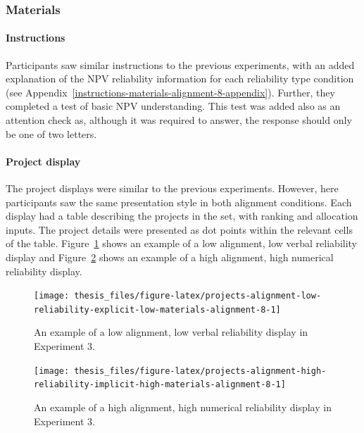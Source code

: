 \documentclass[a4paper, nobind, dvipsnames]{templates/ociamthesis}
\theoremstyle{definition}
\theoremstyle{definition}
\theoremstyle{definition}
\theoremstyle{definition}
\theoremstyle{remark}
\begin{document}
\subsubsection{Materials}

\paragraph{Instructions}

Participants saw similar instructions to the previous experiments, with an added
explanation of the NPV reliability information for each reliability type
condition (see Appendix~\ref{instructions-materials-alignment-8-appendix}). Further, they
completed a test of basic NPV understanding. This test was added also as an
attention check as, although it was required to answer, the response should only
be one of two letters.

\paragraph{Project display}

The project displays were similar to the previous experiments. However, here
participants saw the same presentation style in both alignment conditions. Each
display had a table describing the projects in the set, with ranking and
allocation inputs. The project details were presented as dot points within the
relevant cells of the table.
Figure~\ref{fig:projects-alignment-low-reliability-explicit-low-materials-alignment-8}
shows an example of a low alignment, low verbal reliability display and
Figure~\ref{fig:projects-alignment-high-reliability-implicit-high-materials-alignment-8}
shows an example of a high alignment, high numerical reliability display.



\begin{figure}
\texttt{[image: thesis\_files/figure-latex/projects-alignment-low-reliability-explicit-low-materials-alignment-8-1]} \caption{An example of a low alignment, low verbal reliability display in Experiment 3.}\label{fig:projects-alignment-low-reliability-explicit-low-materials-alignment-8}
\end{figure}



\begin{figure}
\texttt{[image: thesis\_files/figure-latex/projects-alignment-high-reliability-implicit-high-materials-alignment-8-1]} \caption{An example of a high alignment, high numerical reliability display in Experiment 3.}\label{fig:projects-alignment-high-reliability-implicit-high-materials-alignment-8}
\end{figure}
\end{document}
